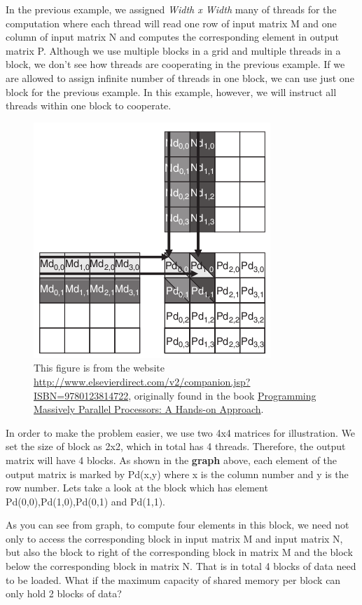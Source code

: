 \documentclass[letterpaper,10pt,openany,oneside]{sphinxmanual}
\begin{document}
In the previous example, we assigned \emph{Width x Width} many of threads for the computation where each thread will read one row of input matrix M and one column of input matrix N and computes the corresponding element in output matrix P. Although we use multiple blocks in a grid and multiple threads in a block, we don't see how threads are cooperating in the previous example. If we are allowed to assign infinite number of threads in one block, we can use just one block for the previous example. In this example, however, we will instruct all threads within one block to cooperate.
\begin{figure}[htbp]
\centering
\capstart

\includegraphics{MMSM1.png}
\caption{This figure is from the website \href{http://www.elsevierdirect.com/v2/companion.jsp?ISBN=9780123814722}{http://www.elsevierdirect.com/v2/companion.jsp?ISBN=9780123814722}, originally found in the book \href{http://www.elsevierdirect.com/morgan\_kaufmann/kirk/}{Programming Massively Parallel Processors: A Hands-on Approach}.}\end{figure}

In order to make the problem easier, we use two 4x4 matrices for illustration. We set the size of block as 2x2, which in total has 4 threads. Therefore, the output matrix will have 4 blocks. As shown in the \textbf{graph} above, each element of the output matrix is marked by Pd(x,y) where x is the column number and y is the row number. Lets take a look at the block which has element Pd(0,0),Pd(1,0),Pd(0,1) and Pd(1,1).

As you can see from graph, to compute four elements in this block, we need not only to access the corresponding block in input matrix M and input matrix N, but also the block to right of the corresponding block in matrix M and the block below the corresponding block in matrix N. That is in total 4 blocks of data need to be loaded. What if the maximum capacity of shared memory per block can only hold 2 blocks of data?
\end{document}
